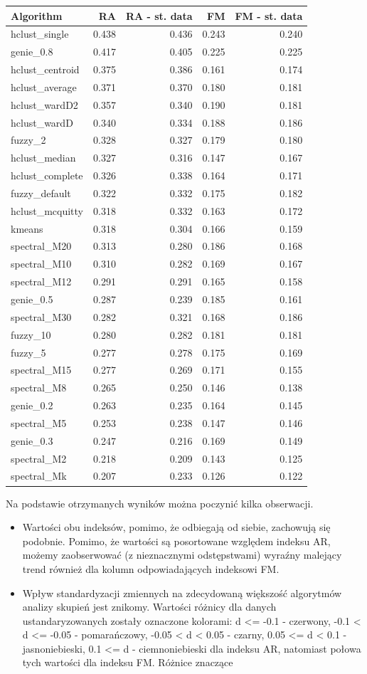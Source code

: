 \documentclass[]{article}
\providecommand{\tightlist}{%
  \setlength{\itemsep}{0pt}\setlength{\parskip}{0pt}}
\begin{document}
\begin{longtable}[]{@{}lrrrr@{}}
\toprule
Algorithm & RA & RA - st. data & FM & FM - st. data\tabularnewline
\midrule
\endhead
hclust\_single & 0.438 & 0.436 & 0.243 & 0.240\tabularnewline
genie\_0.8 & 0.417 & 0.405 & 0.225 & 0.225\tabularnewline
hclust\_centroid & 0.375 & 0.386 & 0.161 & 0.174\tabularnewline
hclust\_average & 0.371 & 0.370 & 0.180 & 0.181\tabularnewline
hclust\_wardD2 & 0.357 & 0.340 & 0.190 & 0.181\tabularnewline
hclust\_wardD & 0.340 & 0.334 & 0.188 & 0.186\tabularnewline
fuzzy\_2 & 0.328 & 0.327 & 0.179 & 0.180\tabularnewline
hclust\_median & 0.327 & 0.316 & 0.147 & 0.167\tabularnewline
hclust\_complete & 0.326 & 0.338 & 0.164 & 0.171\tabularnewline
fuzzy\_default & 0.322 & 0.332 & 0.175 & 0.182\tabularnewline
hclust\_mcquitty & 0.318 & 0.332 & 0.163 & 0.172\tabularnewline
kmeans & 0.318 & 0.304 & 0.166 & 0.159\tabularnewline
spectral\_M20 & 0.313 & 0.280 & 0.186 & 0.168\tabularnewline
spectral\_M10 & 0.310 & 0.282 & 0.169 & 0.167\tabularnewline
spectral\_M12 & 0.291 & 0.291 & 0.165 & 0.158\tabularnewline
genie\_0.5 & 0.287 & 0.239 & 0.185 & 0.161\tabularnewline
spectral\_M30 & 0.282 & 0.321 & 0.168 & 0.186\tabularnewline
fuzzy\_10 & 0.280 & 0.282 & 0.181 & 0.181\tabularnewline
fuzzy\_5 & 0.277 & 0.278 & 0.175 & 0.169\tabularnewline
spectral\_M15 & 0.277 & 0.269 & 0.171 & 0.155\tabularnewline
spectral\_M8 & 0.265 & 0.250 & 0.146 & 0.138\tabularnewline
genie\_0.2 & 0.263 & 0.235 & 0.164 & 0.145\tabularnewline
spectral\_M5 & 0.253 & 0.238 & 0.147 & 0.146\tabularnewline
genie\_0.3 & 0.247 & 0.216 & 0.169 & 0.149\tabularnewline
spectral\_M2 & 0.218 & 0.209 & 0.143 & 0.125\tabularnewline
spectral\_Mk & 0.207 & 0.233 & 0.126 & 0.122\tabularnewline
\bottomrule
\end{longtable}

Na podstawie otrzymanych wyników można poczynić kilka obserwacji.

\begin{itemize}
\tightlist
\item
  Wartości obu indeksów, pomimo, że odbiegają od siebie, zachowują się
  podobnie. Pomimo, że wartości są posortowane względem indeksu AR,
  możemy zaobserwować (z nieznacznymi odstępstwami) wyraźny malejący
  trend również dla kolumn odpowiadających indeksowi FM.
\item
  Wpływ standardyzacji zmiennych na zdecydowaną większość algorytmów
  analizy skupień jest znikomy. Wartości różnicy dla danych
  ustandaryzowanych zostały oznaczone kolorami: d \textless{}= -0.1 -
  czerwony, -0.1 \textless{} d \textless{}= -0.05 - pomarańczowy, -0.05
  \textless{} d \textless{} 0.05 - czarny, 0.05 \textless{}= d
  \textless{} 0.1 - jasnoniebieski, 0.1 \textless{}= d - ciemnoniebieski
  dla indeksu AR, natomiast połowa tych wartości dla indeksu FM. Różnice
  znaczące
\end{itemize}
\end{document}
